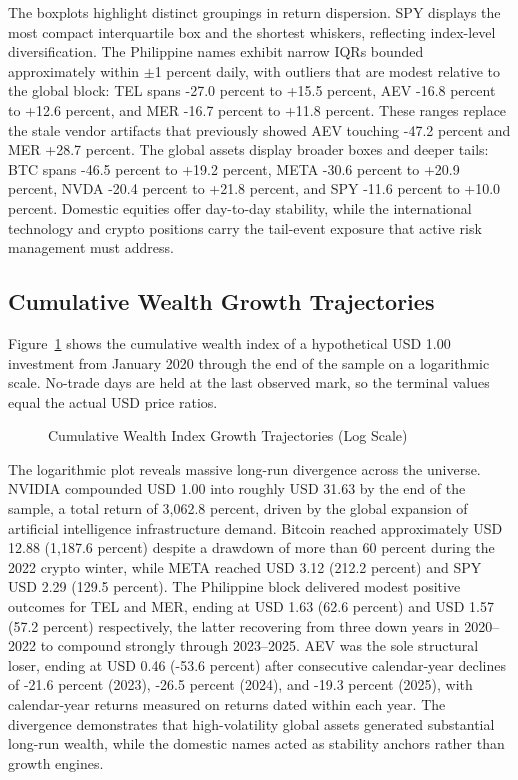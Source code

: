 The boxplots highlight distinct groupings in return dispersion. SPY displays the most compact interquartile box and the shortest whiskers, reflecting index-level diversification. The Philippine names exhibit narrow IQRs bounded approximately within $\pm$1 percent daily, with outliers that are modest relative to the global block: TEL spans -27.0 percent to +15.5 percent, AEV -16.8 percent to +12.6 percent, and MER -16.7 percent to +11.8 percent. These ranges replace the stale vendor artifacts that previously showed AEV touching -47.2 percent and MER +28.7 percent. The global assets display broader boxes and deeper tails: BTC spans -46.5 percent to +19.2 percent, META -30.6 percent to +20.9 percent, NVDA -20.4 percent to +21.8 percent, and SPY -11.6 percent to +10.0 percent. Domestic equities offer day-to-day stability, while the international technology and crypto positions carry the tail-event exposure that active risk management must address.

\subsection{Cumulative Wealth Growth Trajectories}

Figure~\ref{fig:cum_returns} shows the cumulative wealth index of a hypothetical USD 1.00 investment from January 2020 through the end of the sample on a logarithmic scale. No-trade days are held at the last observed mark, so the terminal values equal the actual USD price ratios.

\begin{figure}[H]
  \centering
  \caption{Cumulative Wealth Index Growth Trajectories (Log Scale)}
  \label{fig:cum_returns}
\end{figure}

The logarithmic plot reveals massive long-run divergence across the universe. NVIDIA compounded USD 1.00 into roughly USD 31.63 by the end of the sample, a total return of 3,062.8 percent, driven by the global expansion of artificial intelligence infrastructure demand. Bitcoin reached approximately USD 12.88 (1,187.6 percent) despite a drawdown of more than 60 percent during the 2022 crypto winter, while META reached USD 3.12 (212.2 percent) and SPY USD 2.29 (129.5 percent). The Philippine block delivered modest positive outcomes for TEL and MER, ending at USD 1.63 (62.6 percent) and USD 1.57 (57.2 percent) respectively, the latter recovering from three down years in 2020--2022 to compound strongly through 2023--2025. AEV was the sole structural loser, ending at USD 0.46 (-53.6 percent) after consecutive calendar-year declines of -21.6 percent (2023), -26.5 percent (2024), and -19.3 percent (2025), with calendar-year returns measured on returns dated within each year. The divergence demonstrates that high-volatility global assets generated substantial long-run wealth, while the domestic names acted as stability anchors rather than growth engines.

